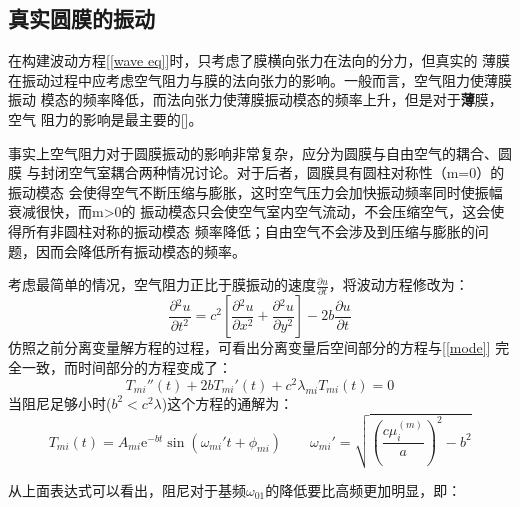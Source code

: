 \documentclass[a4paper]{ctexart}
\def\e{\mathrm{e}}
\newcommand{\pdv}[2]{\frac{\partial{#1}}{\partial{#2}}}
\begin{document}
	\subsection{真实圆膜的振动}
	\par 
	在构建波动方程[\ref{wave eq}]时，只考虑了膜横向张力在法向的分力，但真实的
	薄膜在振动过程中应考虑空气阻力与膜的法向张力的影响。一般而言，空气阻力使薄膜振动
	模态的频率降低，而法向张力使薄膜振动模态的频率上升，但是对于\textbf{薄}膜，空气
	阻力的影响是最主要的[\cite{phy_of_music}]。
	\par 事实上空气阻力对于圆膜振动的影响非常复杂，应分为圆膜与自由空气的耦合、圆膜
	与封闭空气室耦合两种情况讨论。对于后者，圆膜具有圆柱对称性（m=0）的振动模态
	会使得空气不断压缩与膨胀，这时空气压力会加快振动频率同时使振幅衰减很快，而m>0的
	振动模态只会使空气室内空气流动，不会压缩空气，这会使得所有非圆柱对称的振动模态
	频率降低；自由空气不会涉及到压缩与膨胀的问题，因而会降低所有振动模态的频率。
	\par
	考虑最简单的情况，空气阻力正比于膜振动的速度$\pdv{u}{t}$，将波动方程修改为：
	\begin{equation}
		\pdv{^2u}{t^2} = c^2\left[\pdv{^2u}{x^2} + \pdv{^2u}{y^2}\right] - 2b\pdv{u}{t}
	\end{equation}   
	仿照之前分离变量解方程的过程，可看出分离变量后空间部分的方程与[\ref{mode}]
	完全一致，而时间部分的方程变成了：
	\begin{equation}
		T_{mi}{''}(t) + 2bT_{mi}{'}(t) + c^2 \lambda_{mi} T_{mi}(t) = 0
	\end{equation}
	当阻尼足够小时($b^2 < c^2 \lambda$)这个方程的通解为：
	\begin{equation}
		T_{mi}(t) = A_{mi}\e^{-bt}\sin(\omega_{mi}{'}t + \phi_{mi})\quad\quad \omega_{mi}{'} = \sqrt{\left(\frac{c\mu_{i}^{(m)}}{a}\right)^2 - b^2}
	\end{equation}
	\par 从上面表达式可以看出，阻尼对于基频$\omega_{01}$的降低要比高频更加明显，即：
\end{document}
